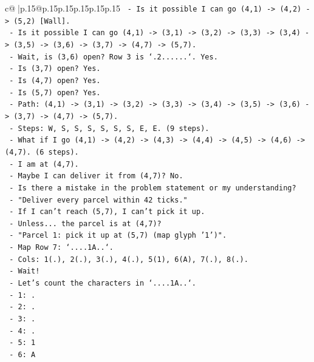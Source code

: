 \documentclass{article}
\begin{document}
{\begin{supertabular}{c@{$\;$}|p{.15\linewidth}@{}p{.15\linewidth}p{.15\linewidth}p{.15\linewidth}p{.15\linewidth}p{.15\linewidth}}
{{{\texttt{     {-} Is it possible I can go (4,1) {-}> (4,2) {-}> (5,2) {[}Wall{]}.} \\
\texttt{     {-} Is it possible I can go (4,1) {-}> (3,1) {-}> (3,2) {-}> (3,3) {-}> (3,4) {-}> (3,5) {-}> (3,6) {-}> (3,7) {-}> (4,7) {-}> (5,7).} \\
\texttt{     {-} Wait, is (3,6) open? Row 3 is `.2......`. Yes.} \\
\texttt{     {-} Is (3,7) open? Yes.} \\
\texttt{     {-} Is (4,7) open? Yes.} \\
\texttt{     {-} Is (5,7) open? Yes.} \\
\texttt{     {-} Path: (4,1) {-}> (3,1) {-}> (3,2) {-}> (3,3) {-}> (3,4) {-}> (3,5) {-}> (3,6) {-}> (3,7) {-}> (4,7) {-}> (5,7).} \\
\texttt{     {-} Steps: W, S, S, S, S, S, S, E, E. (9 steps).} \\
\texttt{     {-} What if I go (4,1) {-}> (4,2) {-}> (4,3) {-}> (4,4) {-}> (4,5) {-}> (4,6) {-}> (4,7). (6 steps).} \\
\texttt{     {-} I am at (4,7).} \\
\texttt{     {-} Maybe I can deliver it from (4,7)? No.} \\
\texttt{     {-} Is there a mistake in the problem statement or my understanding?} \\
\texttt{     {-} "Deliver every parcel within 42 ticks."} \\
\texttt{     {-} If I can't reach (5,7), I can't pick it up.} \\
\texttt{     {-} Unless... the parcel is at (4,7)?} \\
\texttt{       {-} "Parcel 1: pick it up at (5,7) (map glyph '1')".} \\
\texttt{       {-} Map Row 7: `....1A..`.} \\
\texttt{       {-} Cols: 1(.), 2(.), 3(.), 4(.), 5(1), 6(A), 7(.), 8(.).} \\
\texttt{       {-} Wait!} \\
\texttt{       {-} Let's count the characters in `....1A..`.} \\
\texttt{       {-} 1: .} \\
\texttt{       {-} 2: .} \\
\texttt{       {-} 3: .} \\
\texttt{       {-} 4: .} \\
\texttt{       {-} 5: 1} \\
\texttt{       {-} 6: A} \\
}}}
\end{supertabular}}
\end{document}
